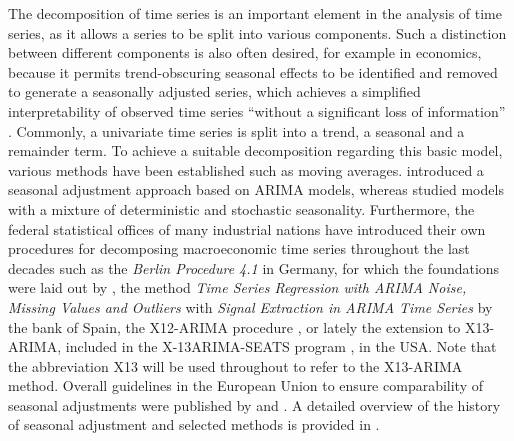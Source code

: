 The decomposition of time series is an important element in the analysis of time series, as it allows a series to be split into various components. Such a distinction between different components is also often desired, for example in economics, because it permits trend-obscuring seasonal effects to be identified and removed to generate a seasonally adjusted series, which achieves a simplified interpretability of observed time series ``without a significant loss of information'' \citep{bell1984issues}. Commonly, a univariate time series is split into a trend, a seasonal and a remainder term. To achieve a suitable decomposition regarding this basic model, various methods have been established \citep[see also Chapter 1.5 in][for an overview of basic approaches]{brockwell2016time} such as moving averages. \citet{hillmer_tiao_1982} introduced a seasonal adjustment approach based on ARIMA models, whereas \citet{pierce_1978} studied models with a mixture of deterministic and stochastic seasonality. Furthermore, the federal statistical offices of many industrial nations have introduced their own procedures for decomposing macroeconomic time series throughout the last decades such as the \emph{Berlin Procedure 4.1} \citep[BV4.1,][]{cieplik2006bv41, speth2004komponentenzerlegung} in Germany, for which the foundations were laid out by \citet{heiler1970theoretische}, the method \emph{Time Series Regression with ARIMA Noise, Missing Values and Outliers} with \emph{Signal Extraction in ARIMA Time Series} \citep[TRAMO-SEATS,][]{gomez1996programs} by the bank of Spain, the X12-ARIMA procedure \citep{david1998x12arima}, or lately the extension to X13-ARIMA, included in the X-13ARIMA-SEATS program \citep{uscensus2017x13}, in the USA. Note that the abbreviation X13 will be used throughout to refer to the X13-ARIMA method. Overall guidelines in the European Union to ensure comparability of seasonal adjustments were published by \citet{eurostat2015} and \citet{eurostat2024}. A detailed overview of the history of seasonal adjustment and selected methods is provided in \citet{mazzi2018handbook}.

